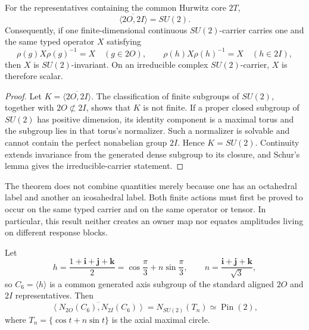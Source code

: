 \documentclass[11pt]{article}
\begin{document}
\begin{theorem}
\label{p1:thm:2O-2I-generate-SU2}
For the representatives containing the common Hurwitz core \(2T\),
\begin{equation}
\label{p1:eq:2O-2I-generate-SU2}
 \boxed{\overline{\langle2O,2I\rangle}=SU(2).}
\end{equation}
Consequently, if one finite-dimensional continuous \(SU(2)\)-carrier carries
one and the same typed operator \(X\) satisfying
\[
 \rho(g)X\rho(g)^{-1}=X\quad(g\in2O),
 \qquad
 \rho(h)X\rho(h)^{-1}=X\quad(h\in2I),
\]
then \(X\) is \(SU(2)\)-invariant.  On an irreducible complex
\(SU(2)\)-carrier, \(X\) is therefore scalar.
\end{theorem}

\begin{proof}
Let \(K=\overline{\langle2O,2I\rangle}\).  The classification of finite
subgroups of \(SU(2)\), together with \(2O\not\subset2I\), shows that \(K\)
is not finite.  If a proper closed subgroup of \(SU(2)\) has positive
dimension, its identity component is a maximal torus and the subgroup lies
in that torus's normalizer.  Such a normalizer is solvable and cannot contain
the perfect nonabelian group \(2I\).  Hence \(K=SU(2)\).  Continuity extends
invariance from the generated dense subgroup to its closure, and Schur's
lemma gives the irreducible-carrier statement.
\end{proof}

\begin{remark}
The theorem does not combine quantities merely because one has an
octahedral label and another an icosahedral label.  Both finite actions must
first be proved to occur on the same typed carrier and on the same operator
or tensor.  In particular, this result neither creates an owner map nor
equates amplitudes living on different response blocks.
\end{remark}



\begin{theorem}
\label{p1:thm:v285-shared-axis-pin2}
Let
\[
 h=\frac{1+\mathbf i+\mathbf j+\mathbf k}{2}
 =\cos\frac{\pi}{3}+n\sin\frac{\pi}{3},
 \qquad
 n=\frac{\mathbf i+\mathbf j+\mathbf k}{\sqrt3},
\]
so \(C_6=\langle h\rangle\) is a common generated axis subgroup of the
standard aligned \(2O\) and \(2I\) representatives.  Then
\[
 \boxed{
 \overline{\left\langle
 N_{2O}(C_6),N_{2I}(C_6)
 \right\rangle}
 =N_{SU(2)}(T_n)\simeq\operatorname{Pin}(2),}
\]
where \(T_n=\{\cos t+n\sin t\}\) is the axial maximal circle.
\end{theorem}
\end{document}
